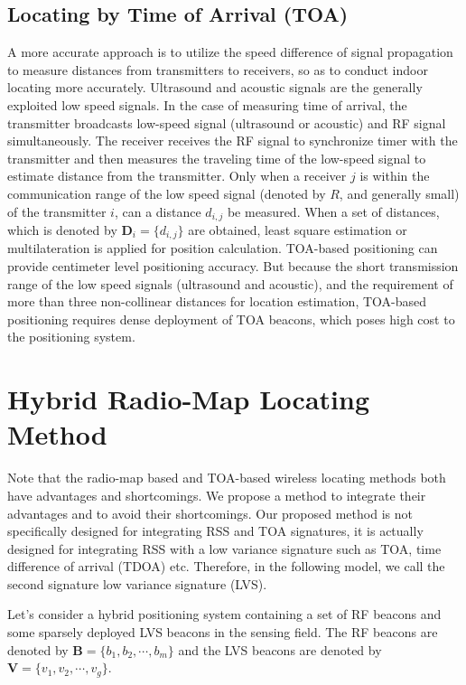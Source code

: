 \documentclass[conference, 10pt]{IEEEtran}
\begin{document}
\subsection{Locating by Time of Arrival (TOA)} 
A more accurate approach is to utilize the speed difference of signal propagation to measure distances from transmitters to receivers, so as to conduct indoor locating more accurately\cite{zhao_autonomous_2008}\cite{gustafsson_positioning_2003}. Ultrasound and acoustic signals are the generally exploited low speed signals. In the case of measuring time of arrival, the transmitter broadcasts low-speed signal (ultrasound or acoustic) and RF signal simultaneously. The receiver receives the RF signal to synchronize timer with the transmitter and then measures the traveling time of the low-speed signal to estimate distance from the transmitter. Only when a receiver $j$ is within the communication range of the low speed signal (denoted by $R$, and generally small) of the transmitter $i$, can a distance $d_{i,j}$ be measured. When a set of distances, which is denoted by $\mathbf{D}_{i}=\{d_{i,j}\}$ are obtained, least square estimation or multilateration is applied for position calculation. TOA-based positioning can provide centimeter level positioning accuracy\cite{wang_lock:_2009}. But because the short transmission range of the low speed signals (ultrasound and acoustic), and the requirement of more than three non-collinear distances for location estimation, TOA-based positioning requires dense deployment of TOA beacons, which poses high cost to the positioning system.

\section{Hybrid Radio-Map Locating Method}
Note that the radio-map based and TOA-based wireless locating methods both have advantages and shortcomings. We propose a method to integrate their advantages and to avoid their shortcomings.  Our proposed method is not specifically designed for integrating RSS and TOA signatures, it is actually designed for integrating RSS with a low variance signature such as TOA, time difference of arrival (TDOA) etc.  Therefore, in the following model, we call the second signature low variance signature (LVS). 

Let's consider a hybrid positioning system containing a set of RF beacons and some sparsely deployed LVS beacons in the sensing field. The RF beacons are denoted by $\mathbf{B}=\{b_{1}, b_{2}, \cdots, b_{m}\}$ and the LVS beacons are denoted by $\mathbf{V}=\{v_{1}, v_{2}, \cdots, v_{g}\}$. 
\end{document}

